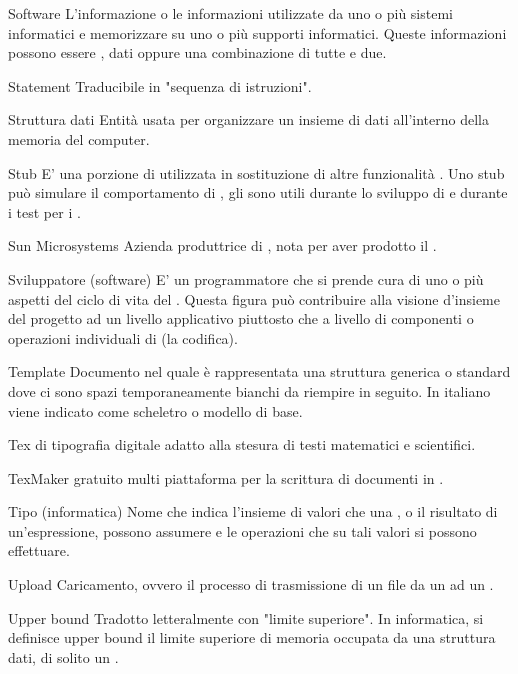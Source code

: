 \elemento
{Software}
{L'informazione o le informazioni utilizzate da uno o più sistemi informatici e memorizzare su uno o più supporti informatici. Queste informazioni possono essere , dati oppure una combinazione di tutte e due.}

\elemento
{Statement}
{Traducibile in "sequenza di istruzioni".}

\elemento
{Struttura dati}
{Entità usata per organizzare un insieme di dati all'interno della memoria del computer.}

\elemento
{Stub}
{E' una porzione di  utilizzata in sostituzione di altre funzionalità . Uno stub può simulare il comportamento di , gli  sono utili durante lo sviluppo di  e durante i test per i .}

\elemento
{Sun Microsystems}
{Azienda produttrice di , nota per aver prodotto il  .}

\elemento
{Sviluppatore (software)}
{E' un programmatore che si prende cura di uno o più aspetti del ciclo di vita del . Questa figura può contribuire alla visione d'insieme del progetto ad un livello applicativo piuttosto che a livello di componenti o operazioni individuali di  (la codifica).}


\elemento
{Template}
{Documento nel quale è rappresentata una struttura generica o standard dove ci sono spazi temporaneamente bianchi da riempire in seguito. In italiano viene indicato come scheletro o modello di base.}

\elemento
{Tex}
{ di tipografia digitale adatto alla stesura di testi matematici e scientifici.}

\elemento
{TexMaker}
{ gratuito multi piattaforma per la scrittura di documenti in .}

\elemento
{Tipo (informatica)}
{Nome che indica l'insieme di valori che una , o il risultato di un'espressione, possono assumere e le operazioni che su tali valori si possono effettuare.}


\elemento
{Upload}
{Caricamento, ovvero il processo di trasmissione di un file da un  ad un .}

\elemento
{Upper bound}
{Tradotto letteralmente con "limite superiore". In informatica, si definisce upper bound il limite superiore di memoria occupata da una struttura dati, di solito un .}

